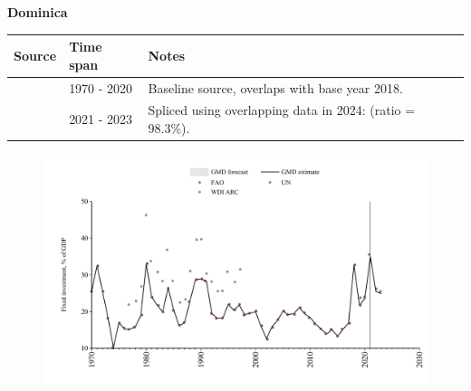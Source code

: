 \documentclass[12pt,a4paper,landscape]{article}
\begin{document}
\begin{adjustbox}{max totalsize={\paperwidth}{\paperheight},center}
\begin{minipage}[t][\textheight][t]{\textwidth}
\vspace*{0.5cm}
{}
\begin{center}
{\Large\bfseries Dominica}
\end{center}
\vspace{0.5cm}
\begin{table}[H]
\centering
\small
\begin{tabular}{|l|l|l|}
\hline
\textbf{Source} & \textbf{Time span} & \textbf{Notes} \\
\hline
\rowcolor{white}\cite{UN}& 1970 - 2020 &Baseline source, overlaps with base year 2018.\\
\rowcolor{lightgray}\cite{FAO}& 2021 - 2023 &Spliced using overlapping data in 2024: (ratio = 98.3\%).\\
\hline
\end{tabular}
\end{table}
\begin{figure}[H]
\centering
\includegraphics[width=\textwidth,height=0.6\textheight,keepaspectratio]{graphs/DMA_finv_GDP.pdf}
\end{figure}
\end{minipage}
\end{adjustbox}
\end{document}
